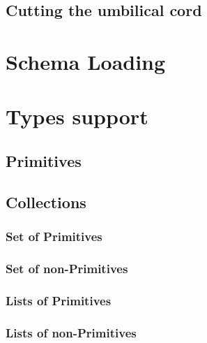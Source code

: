 \subsection{Cutting the umbilical cord}\label{subsec:Cutting the umbilical cord}

\section{Schema Loading}\label{sec:Schema Loading}

\section{Types support}\label{sec:Implementation Types}

\subsection{Primitives}\label{subsec:Types Primitives}

\subsection{Collections}\label{subsec:Types Collections}

\subsubsection{Set of Primitives}
\subsubsection{Set of non-Primitives}
\subsubsection{Lists of Primitives}
\subsubsection{Lists of non-Primitives}

